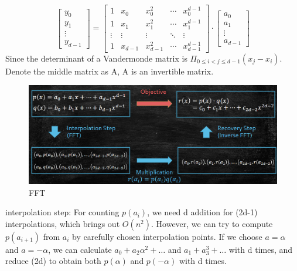 \begin{thm}
    \[
    \begin{bmatrix}
        y_0 \\ y_1 \\
        \vdots\\
        y_{d-1}
        
    \end{bmatrix}
    =
    \begin{bmatrix}
        1 & x_0 & x_0^2 & \cdots & x_0^{d-1} \\
        1 & x_1 & x_1^2 & \cdots & x_1^{d-1} \\
        \vdots & \vdots & \vdots & \ddots & \vdots \\
        1 & x_{d-1} & x_{d-1}^2 & \cdots & x_{d-1}^{d-1}
    \end{bmatrix}
    \cdot
    \begin{bmatrix}
        a_0 \\ a_1 \\
        \vdots\\
        a_{d-1}
        
    \end{bmatrix}
\]
Since the determinant of a Vandermonde matrix is $\Pi_{0\leq i < j \leq d-1}(x_j-x_i)$. Denote the middle matrix as A, A is an invertible matrix.

\end{thm}

\begin{figure}
    \centering
    \includegraphics[width=0.8\linewidth]{Notes/fig/FFT.png}
    \caption{FFT}
    \label{fig:FFT}
\end{figure}

interpolation step:
For counting $p(a_i)$, we need d addition for (2d-1) interpolations, which brings out $O(n^2)$.
However, we can try to compute $p(a_{i+1})$ from $a_i$ by carefully chosen interpolation points.
If we choose $a=\alpha$ and $a=-\alpha$, we can calculate $a_0+a_2\alpha^2+\ldots$ and $a_1+a_3^3+\ldots$ with d times, and reduce (2d) to obtain both $p(\alpha)$ and $p(-\alpha)$ with d times.

